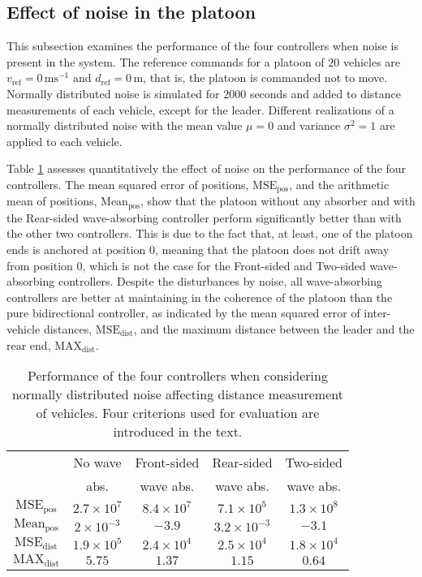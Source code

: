 \documentclass[final,5p,times,twocolumn]{elsarticle}
\begin{document}
\subsection{Effect of noise in the platoon}

This subsection examines the performance of the four controllers when noise is present in the system. The reference commands for a platoon of $20$ vehicles are $v_{\text{ref}}= 0\,\text{ms}^{-1}$ and $d_{\text{ref}} = 0\,\text{m}$, that is, the platoon is commanded not to move. Normally distributed noise is simulated for $2000$ seconds and added to distance measurements of each vehicle, except for the leader. Different realizations of a normally distributed noise with the mean value $\mu = 0$ and variance $\sigma^2 = 1$ are applied to each vehicle.

Table \ref{table_noise} assesses quantitatively the effect of noise on the performance of the four controllers. The mean squared error of positions, $\text{MSE}_{\text{pos}}$, and the arithmetic mean of positions, $\text{Mean}_{\text{pos}}$, show that the platoon without any absorber and with the Rear-sided wave-absorbing controller perform significantly better than with the other two controllers. This is due to the fact that, at least, one of the platoon ends is anchored at position $0$, meaning that the platoon does not drift away from position $0$, which is not the case for the Front-sided and Two-sided wave-absorbing controllers. Despite the disturbances by noise, all wave-absorbing controllers are better at maintaining in the coherence of the platoon than the pure bidirectional controller, as indicated by the mean squared error of inter-vehicle distances, $\text{MSE}_{\text{dist}}$, and the maximum distance between the leader and the rear end, $\text{MAX}_{\text{dist}}$.


\begin{table}[!h]
\renewcommand{\arraystretch}{1.1}
\caption{Performance of the four controllers when considering normally distributed noise affecting distance measurement of vehicles. Four criterions used for evaluation are introduced in the text.}
\label{table_noise}
\centering
\small
\begin{tabular}{|c|c|c|c|c|}
\hline
& No wave & Front-sided &  Rear-sided & Two-sided\\
& abs. & wave abs. & wave abs. & wave abs. \\
\hline
 $\text{MSE}_{\text{pos}}$ & $2.7\times 10^7$ & $8.4\times 10^7$ & $7.1\times 10^5$ & $1.3\times 10^8$\\
\hline
 $\text{Mean}_{\text{pos}}$ & $2\times 10^{-3}$ & $-3.9$ & $3.2\times 10^{-3}$ & $-3.1$\\
\hline
$\text{MSE}_{\text{dist}}$ & $1.9\times 10^5$ & $2.4\times 10^4$ & $2.5\times 10^4$ & $1.8\times 10^4$\\
\hline
$\text{MAX}_{\text{dist}}$ & $5.75$ & $1.37$ & $1.15$ & $0.64$\\
\hline
\end{tabular}
\end{table}
\normalsize
\end{document}
